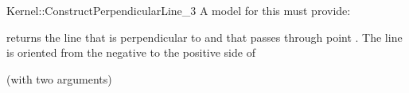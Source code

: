 \begin{ccRefFunctionObjectConcept}{Kernel::ConstructPerpendicularLine_3}
A model for this must provide:


       {returns the line that is perpendicular to  and that
        passes through point . The line is oriented from
        the negative to the positive side of }

\ccRefines
{} (with two arguments)

\ccSeeAlso
{} \\

\end{ccRefFunctionObjectConcept}
